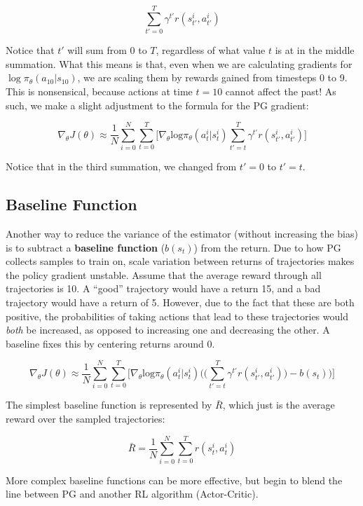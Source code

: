     $$\sum_{t'=0}^T \gamma^{t'} r(s_{t'}^i, a_{t'}^i)$$

    Notice that $t'$ will sum from 0 to $T$, regardless of what value $t$ is at in the middle summation. What this means is that, even when we are calculating gradients for $\log\pi_\theta(a_{10}|s_{10})$, we are scaling them by rewards gained from timesteps 0 to 9. This is nonsensical, because actions at time $t=10$ cannot affect the past! As such, we make a slight adjustment to the formula for the PG gradient:

    $$\nabla_\theta J(\theta) \approx \frac{1}{N}\sum_{i=0}^N\sum_{t=0}^T\biggl[ \nabla_\theta \mathrm{log}\pi_\theta(a_t^i|s_t^i)\sum_{t'=t}^T \gamma^{t'} r(s_{t'}^i, a_{t'}^i)\biggr]$$

    Notice that in the third summation, we changed from $t'=0$ to $t'=t$.
\subsection{Baseline Function}
    \large Another way to reduce the variance of the estimator (without increasing the bias) is to subtract a \textbf{baseline function} ($b(s_t)$) from the return. Due to how PG collects samples to train on, scale variation between returns of trajectories makes the policy gradient unstable. Assume that the average reward through all trajectories is 10. A ``good'' trajectory would have a return 15, and a bad trajectory would have a return of 5. However, due to the fact that these are both positive, the probabilities of taking actions that lead to these trajectories would \textit{both} be increased, as opposed to increasing one and decreasing the other. A baseline fixes this by centering returns around 0.

    $$\nabla_\theta J(\theta) \approx \frac{1}{N}\sum_{i=0}^N\sum_{t=0}^T\biggl[ \nabla_\theta \mathrm{log}\pi_\theta(a_t^i|s_t^i)\biggl(\biggl(\sum_{t'=t}^T \gamma^{t'} r(s_{t'}^i, a_{t'}^i)\biggl) - b(s_t)\biggr)\biggr]$$

    The simplest baseline function is represented by $\bar{R}$, which just is the average reward over the sampled trajectories:

    $$\bar{R} = \frac{1}{N}\sum_{i=0}^N \sum_{t=0}^T r(s_t^i,a_t^i)$$

    More complex baseline functions can be more effective, but begin to blend the line between PG and another RL algorithm (Actor-Critic). 
